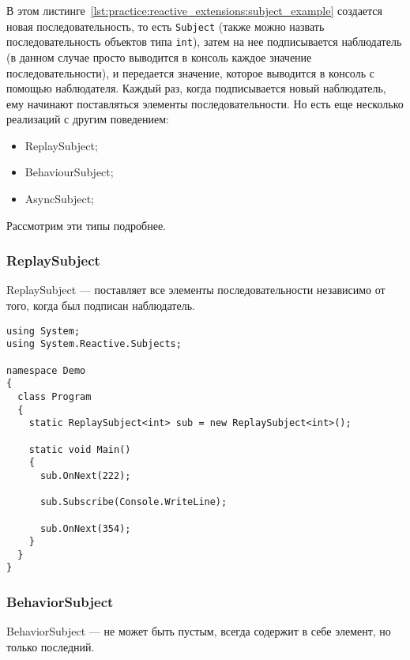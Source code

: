 В этом листинге~\ref{lst:practice:reactive_extensions:subject_example} создается новая последовательность, то есть \lstinline[style=csharpinlinestyle]!Subject!
(также можно назвать последовательность объектов типа \lstinline[style=csharpinlinestyle]!int!),
затем на нее подписывается наблюдатель (в данном случае просто выводится в консоль каждое значение последовательности),
и передается значение, которое выводится в консоль с помощью наблюдателя. Каждый раз, когда подписывается новый наблюдатель,
ему начинают поставляться элементы последовательности. Но есть еще несколько реализаций с другим поведением:

\begin{itemize}
  \item ReplaySubject;
  \item BehaviourSubject;
  \item AsyncSubject;
\end{itemize}

Рассмотрим эти типы подробнее.

\subsubsection{ReplaySubject}
\label{subsub:practice:reactive_extensions:replay_subject}

ReplaySubject --- поставляет все элементы последовательности независимо от того, когда был подписан наблюдатель.

\begin{lstlisting}[style=csharpinlinestyle, caption={Пример использования ReplaySubject}, label=lst:practice:reactive_extensions:replay_subject_example]
using System;
using System.Reactive.Subjects;

namespace Demo
{
  class Program
  {
    static ReplaySubject<int> sub = new ReplaySubject<int>();

    static void Main()
    {
      sub.OnNext(222);

      sub.Subscribe(Console.WriteLine);

      sub.OnNext(354);
    }
  }
}
\end{lstlisting}

\subsubsection{BehaviorSubject}
\label{subsub:practice:reactive_extensions:behavior_subject}

BehaviorSubject --- не может быть пустым, всегда содержит в себе элемент, но только последний.

